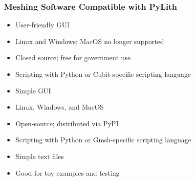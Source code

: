 \documentclass[aspectratio=169]{beamer}
\begin{document}
\begin{frame}
  \frametitle{Meshing Software Compatible with PyLith}
  \summary{}

  \begin{itemize}
    \begin{itemize}
      \item User-friendly GUI
      \item Linux and Windows; MacOS no longer supported
      \item Closed source; free for government use
      \item Scripting with Python or Cubit-specific scripting language
    \end{itemize}
    \begin{itemize}
      \item Simple GUI
      \item Linux, Windows, and MacOS
      \item Open-source; distributed via PyPI
      \item Scripting with Python or Gmsh-specific scripting language
    \end{itemize}
    \begin{itemize}
      \item Simple text files
      \item Good for toy examples and testing
    \end{itemize}
  \end{itemize}

\end{frame}
\end{document}
